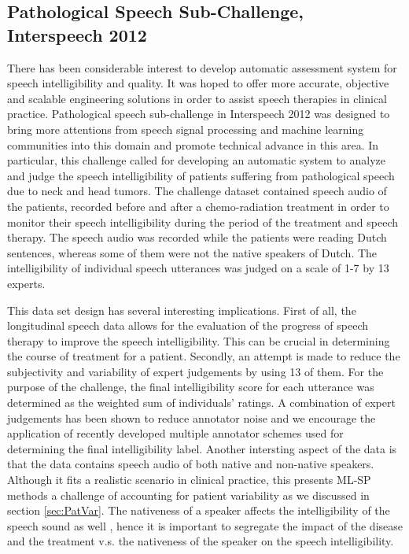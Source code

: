 \documentclass{article}
\begin{document}
\subsection{Pathological Speech Sub-Challenge, Interspeech 2012}
There has been considerable interest to develop automatic assessment system for speech intelligibility and quality. It was hoped to offer more accurate, objective and scalable engineering solutions in order to assist speech therapies in clinical practice. Pathological speech sub-challenge in Interspeech 2012 was designed to bring more attentions from speech signal processing and machine learning communities into this domain and promote technical advance in this area.
In particular, this challenge called for developing an automatic system to analyze and judge the speech intelligibility of patients suffering from pathological speech due to neck and head tumors.
The challenge dataset contained speech audio of the patients, recorded before and after a chemo-radiation treatment in order to monitor their speech intelligibility during the period of the treatment and speech therapy.
The speech audio was recorded while the patients were reading Dutch sentences, whereas some of them were not the native speakers of Dutch.
The intelligibility of individual speech utterances was judged on a scale of 1-7 by 13 experts.

This data set design has several interesting implications.
First of all, the longitudinal speech data allows for the evaluation of the progress of speech therapy to improve the speech intelligibility.
This can be crucial in determining the course of treatment for a patient.
Secondly, an attempt is made to reduce the subjectivity and variability of expert judgements by using 13 of them.
For the purpose of the challenge, the final intelligibility score for each utterance was determined as the weighted sum of individuals' ratings.
A combination of expert judgements has been shown to reduce annotator noise \cite{kuncheva2004combining} and we encourage the application of recently developed multiple annotator schemes \cite{audhkhasi2013globally} used for determining the final intelligibility label. 
Another intersting aspect of the data is that the data contains speech audio of both native and non-native speakers. Although it fits a realistic scenario in clinical practice, this presents ML-SP methods a challenge of accounting for patient variability as we discussed in section \ref{sec:PatVar}.
The nativeness of a speaker affects the intelligibility of the speech sound as well \cite{van2001intelligibility}, hence it is important to segregate the impact of the disease and the treatment v.s. the nativeness of the speaker on the speech intelligibility.
\end{document}
